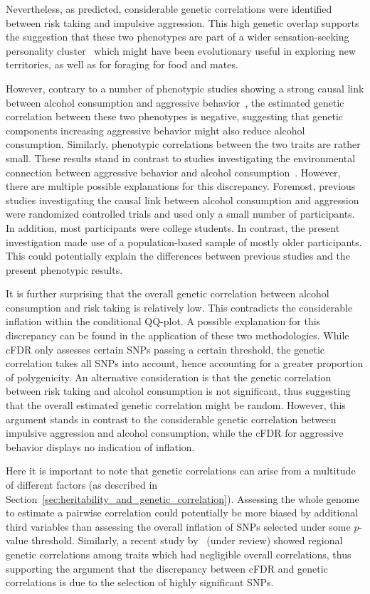Nevertheless, as predicted, considerable genetic correlations were identified between risk taking and impulsive aggression.
This high genetic overlap supports the suggestion that these two phenotypes are part of a wider sensation-seeking personality cluster~\cite{Zuckerman2000} which might have been evolutionary useful in exploring new territories, as well as for foraging for food and mates.

However, contrary to a number of phenotypic studies showing a strong causal link between alcohol consumption and aggressive behavior~\cite{FRANZKOWIAX1987,Zuckerman2000,Dakwar2011}, the estimated genetic correlation between these two phenotypes is negative, suggesting that genetic components increasing aggressive behavior might also reduce alcohol consumption.
Similarly, phenotypic correlations between the two traits are rather small.
These results stand in contrast to studies investigating the environmental connection between aggressive behavior and alcohol consumption~\cite{Bushman1990}.
However, there are multiple possible explanations for this discrepancy.
Foremost, previous studies investigating the causal link between alcohol consumption and aggression were randomized controlled trials and used only a small number of participants.
In addition, most participants were college students.
In contrast, the present investigation made use of a population-based sample of mostly older participants.
This could potentially explain the differences between previous studies and the  present phenotypic results.

It is further surprising that the overall genetic correlation between alcohol consumption and risk taking is relatively low.
This contradicts the considerable inflation within the conditional QQ-plot.
A possible explanation for this discrepancy can be found in the application of these two methodologies.
While cFDR only assesses certain SNPs passing a certain threshold, the genetic correlation takes all SNPs into account, hence accounting for a greater proportion of polygenicity.
An alternative consideration is that the genetic correlation between risk taking and alcohol consumption is not significant, thus suggesting that the overall estimated genetic correlation might be random.
However, this argument stands in contrast to the considerable genetic correlation between impulsive aggression and alcohol consumption, while the cFDR for aggressive behavior displays no indication of  inflation.

Here it is important to note that genetic correlations can arise from a multitude of different factors (as described in Section~\ref{sec:heritability_and_genetic_correlation}).
Assessing the whole genome to estimate a pairwise correlation could potentially be more biased by additional third variables than assessing the overall inflation of SNPs selected under some $p$-value threshold.
Similarly, a recent study by~\citet{Shi2016a} (under review) showed regional genetic correlations among traits which had negligible overall correlations,
thus supporting the argument that the discrepancy between cFDR and genetic correlations is due to the selection of highly significant SNPs.


